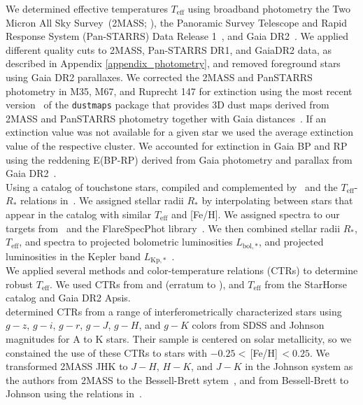\documentclass{aa}
\begin{document}
We determined effective temperatures $T_\mathrm{eff}$ using broadband photometry the Two Micron All Sky Survey~(2MASS; \citealt{skrutskie_two_2006}), the Panoramic Survey Telescope and Rapid Response System \mbox{(Pan-STARRS)} Data Release 1~\citep{2016arXiv161205560C}, and Gaia DR2~\citep{gaia_dr2_release_2018}. We applied different quality cuts to 2MASS, Pan-STARRS DR1, and GaiaDR2 data, as described in Appendix \ref{appendix_photometry}, and removed foreground stars using Gaia DR2 parallaxes. We corrected the 2MASS and PanSTARRS photometry in M35, M67, and Ruprecht 147 for extinction using the most recent version~\citep{green_bayestar_2019} of the \texttt{dustmaps} package that provides 3D dust maps derived from 2MASS and PanSTARRS photometry together with Gaia distances~\citep{green_dustmaps_2018}. If an extinction value was not available for a given star we used the average extinction value of the respective cluster. We accounted for extinction in Gaia BP and RP using the reddening E(BP-RP) derived from Gaia photometry and parallax from Gaia DR2~\citep{andrae_gaiaapsis_2018}.
\\
Using a catalog of touchstone stars, compiled and complemented by~\citet{yee_specmatch_2017} and the $T_\mathrm{eff}$-$R_*$ relations in~\citet{mann_how_2015, mann_erratum_2016}. We assigned stellar radii $R_*$ by interpolating between stars that appear in the catalog with similar $T_\mathrm{eff}$ and [Fe/H]. We assigned spectra to our targets from~\citet{yee_specmatch_2017} and the FlareSpecPhot library~\citep{Schmidt2014b,Kirkpatrick2010, Burgasser2007,Burgasser2008,Burgasser2010, Burgasser2004,Cruz2004, Burgasser2006, Rayner2009, Doi2010, Filippazzo2015, Cruz2003, West2011, Bochanski2010,  Bochanski2007, Schmidt2010, Schmidt2015, Schmidt2014a, mann_how_2015}. We then combined stellar radii $R_*$, $T_\mathrm{eff}$, and spectra to projected bolometric luminosities $L_{\mathrm{bol,*}}$, and projected luminosities in the Kepler band $L_{\mathrm{Kp,*}}$~\citep{shibayama_superflares_2013,ilin_flares_2019}.
\\
We applied several methods and color-temperature relations (CTRs) to determine robust $T_\mathrm{eff}$. We used CTRs from \citet{boyajian_stellar_2013} and \citet{mann_erratum_2016} (erratum to \citealt{mann_how_2015}), and $T_\mathrm{eff}$ from the StarHorse catalog and Gaia DR2 Apsis.
\\
\citet{boyajian_stellar_2013} determined CTRs from a range of interferometrically characterized stars using $g-z$, $g-i$, $g-r$, $g-J$, $g-H$, and $g-K$ colors from SDSS and Johnson magnitudes for A to K stars. Their sample is centered on solar metallicity, so we constained the use of these CTRs to stars with $-0.25<$\,[Fe/H]$\,<0.25$. We transformed 2MASS JHK to $J-H$, $H-K$, and $J-K$ in the Johnson system  as the authors from 2MASS to the Bessell-Brett sytem~\citep{carpenter_color_2001}, and from Bessell-Brett to Johnson using the relations in~\citet{bessell_brett_1988}. 
\end{document}

